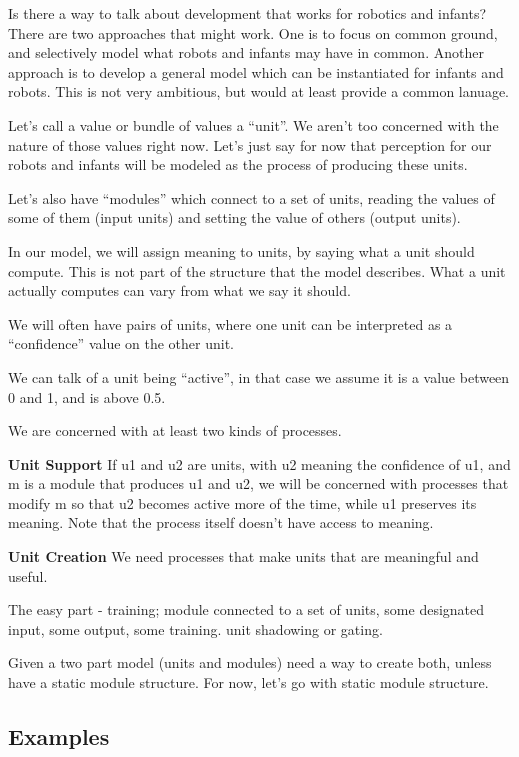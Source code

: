 
Is there a way to talk about development that works
for robotics and infants?  There are two approaches
that might work.  One is to focus on common ground,
and selectively model what robots and infants may
have in common.  Another approach is to develop
a general model which can be instantiated for
infants and robots.  This is not very 
ambitious, but would at least provide a common lanuage.




Let's call a value or bundle of values a ``unit''.  We aren't
too concerned with the nature of those values right now.  Let's 
just say for now that perception for our robots and infants will
be modeled as the process of producing these units.

Let's also have ``modules'' which connect to a set of units,
reading the values of some of them (input units) and setting
the value of others (output units).

In our model, we will assign meaning to units, by saying
what a unit should compute.  This is not part of the
structure that the model describes.  What a unit actually
computes can vary from what we say it should.

We will often have pairs of units, where one unit can
be interpreted as a ``confidence'' value on the other unit.

We can talk of a unit being ``active'', in that case we
assume it is a value between 0 and 1, and is above 0.5.

We are concerned with at least two kinds of processes.

{\bf Unit Support}  If u1 and u2 are units,
with u2 meaning the confidence of u1,
and m is a module that produces u1 and u2,
we will be concerned with processes that modify
m so that u2 becomes active more of the time,
while u1 preserves its meaning.  Note that 
the process itself doesn't have access to meaning.

{\bf Unit Creation} We need processes that
make units that are meaningful and useful.

The easy part - training; module connected to a set of units,
some designated input, some output, some training.  unit 
shadowing or gating.

Given a two part model (units and modules) need a way to 
create both, unless have a static module structure.  For now,
let's go with static module structure.


\subsection{Examples}

